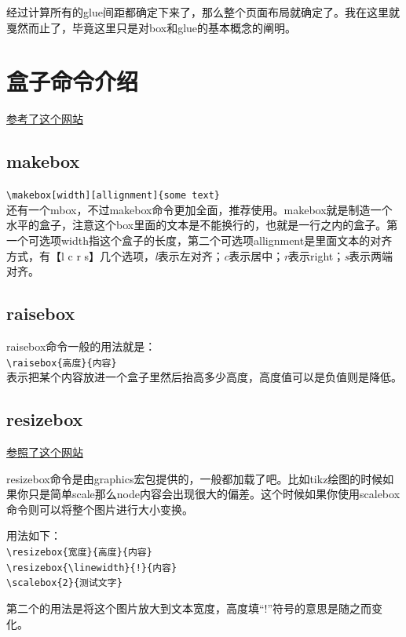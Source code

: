 \documentclass[11pt,oneside]{book}
\begin{document}
经过计算所有的glue间距都确定下来了，那么整个页面布局就确定了。我在这里就戛然而止了，毕竟这里只是对box和glue的基本概念的阐明。


\section{盒子命令介绍}
\href{http://tex.stackexchange.com/questions/83930/what-are-the-different-kinds-of-boxes-in-latex}{参考了这个网站}

\subsection{makebox}
\verb+\makebox[width][allignment]{some text}+\\
还有一个mbox，不过makebox命令更加全面，推荐使用。makebox就是制造一个水平的盒子，注意这个box里面的文本是不能换行的，也就是一行之内的盒子。第一个可选项width指这个盒子的长度，第二个可选项allignment是里面文本的对齐方式，有【l c r s】几个选项，\emph{l}表示左对齐；\emph{c}表示居中；\emph{r}表示right；\emph{s}表示两端对齐。



\subsection{raisebox}
raisebox命令一般的用法就是：\\
\verb+\raisebox{高度}{内容}+\\
表示把某个内容放进一个盒子里然后抬高多少高度，高度值可以是负值则是降低。

\subsection{resizebox}
\href{http://tex.stackexchange.com/questions/13460/scalebox-knowing-how-much-it-scales}{参照了这个网站}

resizebox命令是由graphics宏包提供的，一般都加载了吧。比如tikz绘图的时候如果你只是简单scale那么node内容会出现很大的偏差。这个时候如果你使用scalebox命令则可以将整个图片进行大小变换。

用法如下：\\
\verb+\resizebox{宽度}{高度}{内容} +\\
\verb+\resizebox{\linewidth}{!}{内容}+\\
\verb+\scalebox{2}{测试文字}+

第二个的用法是将这个图片放大到文本宽度，高度填“!”符号的意思是随之而变化。

\end{document}
